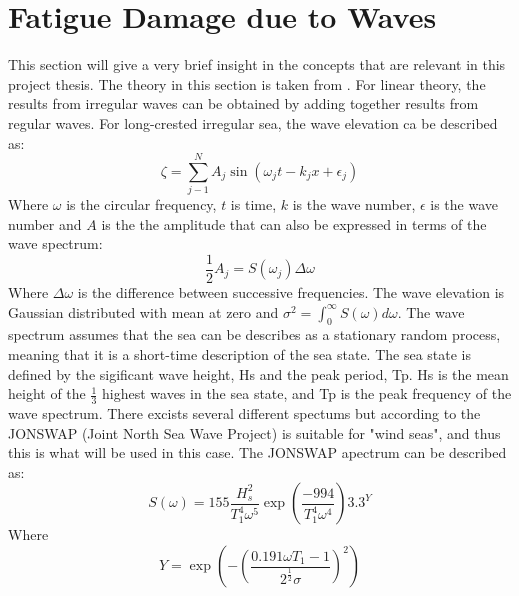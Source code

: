 \chapter{Fatigue Damage due to Waves}
\label{chap:enviroment}
This section will give a very brief insight in the concepts that are relevant in this project thesis. The theory in this section is taken from \cite{Faltinsen1990}.  For linear theory, the results from irregular waves can be obtained by adding together results from regular waves. For long-crested irregular sea, the wave elevation ca be described as:
\begin{equation}
    \zeta = \sum_{j-1}^N A_j \sin(\omega_jt-k_jx+\epsilon_j)
    \label{eq:elevation}
\end{equation}
\cite{Faltinsen1990}
Where $\omega$ is the circular frequency, $t$ is time, $k$ is the wave number, $\epsilon$ is the wave number and $A$ is the the amplitude that can also be expressed in terms of the wave spectrum:
\begin{equation}
    \frac{1}{2}A_j=S(\omega_j) \Delta \omega
\end{equation}
Where $\Delta \omega$ is the difference between successive frequencies. The wave elevation is Gaussian distributed with mean at zero and $\sigma^2= \int_0 ^ \infty S(\omega) d\omega $. The wave spectrum assumes that the sea can be describes as a stationary random process, meaning that it is a short-time description of the sea state. The sea state is defined by the sigificant wave height, Hs and the peak period, Tp. Hs is the mean height of the $\frac{1}{3}$ highest waves in the sea state, and Tp is the peak frequency of the wave spectrum. There excists several different spectums but according to \cite{Lifes50+D1.1} the JONSWAP (Joint North Sea Wave Project) is suitable for "wind seas", and thus this is what will be used in this case. The JONSWAP apectrum can be described as:
\begin{equation}
    S(\omega)=155 \frac{H_s^2}{T_1^4 \omega ^5} \exp{(\frac{-994}{T_1^4 \omega ^4})} 3.3^Y
\end{equation}
Where
\begin{equation}
    Y= \exp \left(-\left( \frac{0.191 \omega T_1 -1}{2^\frac{1}{2} \sigma} \right)^2\right)
\end{equation}

